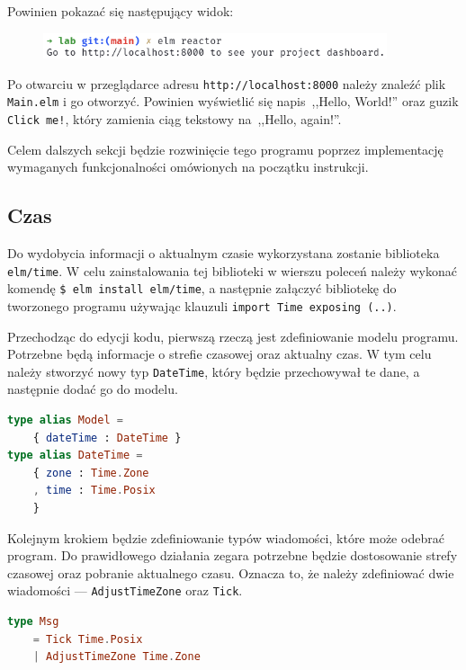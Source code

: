 \documentclass[twoside,a4paper]{report}
\begin{document}
Powinien pokazać się następujący widok:

\begin{figure}[H]
    \centering
    \includegraphics[width=0.9\textwidth]{img/elm_reactor}
\end{figure}

Po otwarciu w przeglądarce adresu \texttt{http://localhost:8000} należy znaleźć plik \texttt{Main.elm} i go otworzyć.
Powinien wyświetlić się napis~,,Hello, World!'' oraz guzik \texttt{Click me!}, który zamienia ciąg tekstowy na~,,Hello, again!''.

Celem dalszych sekcji będzie rozwinięcie tego programu poprzez implementację wymaganych funkcjonalności omówionych na początku instrukcji.

\subsection{Czas}
Do wydobycia informacji o aktualnym czasie wykorzystana zostanie biblioteka \texttt{elm/time}.
W celu zainstalowania tej biblioteki w wierszu poleceń należy wykonać komendę \texttt{\$ elm install elm/time}, a następnie załączyć bibliotekę do tworzonego programu używając klauzuli \texttt{import Time exposing (..)}.

Przechodząc do edycji kodu, pierwszą rzeczą jest zdefiniowanie modelu programu.
Potrzebne będą informacje o strefie czasowej oraz aktualny czas.
W tym celu należy stworzyć nowy typ \texttt{DateTime}, który będzie przechowywał te dane, a następnie dodać go do modelu.

\begin{lstlisting}[language=Elm]
type alias Model =
    { dateTime : DateTime }
type alias DateTime =
    { zone : Time.Zone
    , time : Time.Posix
    }
\end{lstlisting}

Kolejnym krokiem będzie zdefiniowanie typów wiadomości, które może odebrać program.
Do prawidłowego działania zegara potrzebne będzie dostosowanie strefy czasowej oraz pobranie aktualnego czasu.
Oznacza to, że należy zdefiniować dwie wiadomości --- \texttt{AdjustTimeZone} oraz \texttt{Tick}.

\begin{lstlisting}[language=Elm]
type Msg
    = Tick Time.Posix
    | AdjustTimeZone Time.Zone
\end{lstlisting}
\end{document}
